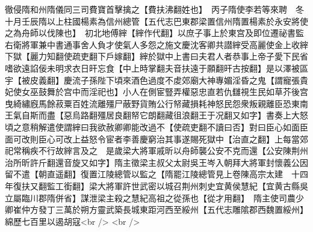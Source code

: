 徹侵隋和州隋儀同三司費寶首擊擒之【費扶沸翻姓也】　丙子隋使李若等來聘　冬十月壬辰隋以上柱國楊素為信州總管【五代志巴東郡梁置信州隋置楊素於永安將使之為舟師以伐陳也】　初北地傅縡【縡作代翻】以庶子事上於東宫及即位遷祕書監右衛將軍兼中書通事舍人負才使氣人多怨之施文慶沈客卿共譛縡受高麗使金上收縡下獄【麗力知翻使疏吏翻下戶嫁翻】縡於獄中上書曰夫君人者恭事上帝子愛下民省嗜欲遠諂佞未明求衣日旰忘食【中上時掌翻夫音扶遠于願翻旰古按翻】是以澤被區宇【被皮義翻】慶流子孫陛下頃來酒色過度不䖍郊廟大神專媚淫昏之鬼【謂寵張貴妃使女巫鼓舞於宫中而淫祀也】小人在側宦豎弄權惡忠直若仇讎視生民如草芥後宫曳綺繡廐馬餘菽粟百姓流離殭尸蔽野貨賄公行帑藏損耗神怒民怨衆叛親離臣恐東南王氣自斯而盡【惡烏路翻殭居良翻帑它朗翻藏徂浪翻王于况翻又如字】書奏上大怒頃之意稍解遣使謂縡曰我欲赦卿卿能改過不【使疏吏翻不讀曰否】對曰臣心如面臣面可改則臣心可改上益怒令宦者李善慶窮治其事遂賜死獄中【治直之翻】上每當郊祀常稱疾不行故縡言及之　是歲梁大將軍戚昕以舟師襲公安不克而還【公安陳荆州治所昕許斤翻還音旋又如字】隋主徵梁主叔父太尉吳王岑入朝拜大將軍封懷義公因留不遣【朝直遥翻】復置江陵總管以監之【隋罷江陵總管見上卷陳高宗太建　十四年復扶又翻監工銜翻】梁大將軍許世武密以城召荆州刺史宜黄侯慧紀【宜黄古縣吳立屬臨川郡隋併省】謀泄梁主殺之慧紀高祖之從孫也【從才用翻】　隋主使司農少卿崔仲方發丁三萬於朔方靈武築長城東距河西至綏州【五代志雕隂郡西魏置綏州】綿歷七百里以遏胡寇<br />
<br />
